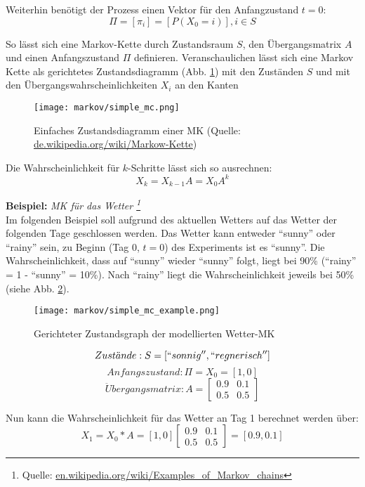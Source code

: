 Weiterhin benötigt der Prozess einen Vektor für den Anfangzustand \( t = 0 \):
\[ \Pi = [ \pi_i] = [ P (X_0 = i) ] , i \in S \]

So lässt sich eine Markov-Kette durch Zustandsraum \(S\), den Übergangsmatrix \( A \) und einen Anfangszustand \( \Pi \) definieren.
Veranschaulichen lässt sich eine Markov Kette als gerichtetes Zustandsdiagramm (Abb. \ref{fig:simple_mc}) mit den Zuständen \(S\) und 
mit den Übergangswahrscheinlichkeiten \(X_i\) an den Kanten
\begin{figure}[htbp] \centering
    \texttt{[image: markov/simple\_mc.png]}
    \caption{Einfaches Zustandsdiagramm einer \acl{MK} (Quelle: \url{de.wikipedia.org/wiki/Markow-Kette})}
    \label{fig:simple_mc}
\end{figure}

Die Wahrscheinlichkeit für \( k \)-Schritte lässt sich so ausrechnen: 
\[ X_k = X_{k-1} A = X_0 A^k \] 


\textbf{Beispiel:} 
\textit{ \acl{MK} für das Wetter \footnote{Quelle: \url{en.wikipedia.org/wiki/Examples_of_Markov_chains}}} \\
Im folgenden Beispiel soll aufgrund des aktuellen Wetters auf das Wetter der folgenden Tage geschlossen werden.
Das Wetter kann entweder ``sunny'' oder ``rainy'' sein, zu Beginn (Tag 0, \( t = 0 \)) des Experiments ist es ``sunny''.
Die Wahrscheinlichkeit, dass auf ``sunny'' wieder ``sunny'' folgt, liegt bei 90\% (``rainy'' = 1 - ``sunny'' = 10\%). 
Nach ``rainy'' liegt die Wahrscheinlichkeit jeweils bei 50\% (siehe Abb. \ref{fig:simple_mc_example}).  
\begin{figure}[htbp] \centering
    \texttt{[image: markov/simple\_mc\_example.png]}
    \caption{ Gerichteter Zustandsgraph der modellierten Wetter-\acl{MK} }
    \label{fig:simple_mc_example}
\end{figure}


\[ Zust\ddot{a}nde: S = [``sonnig'', ``regnerisch''] \]
\[ Anfangszustand:  \Pi = X_0 = [1 , 0] \]
\[\ddot{U}bergangsmatrix: A = \begin {bmatrix} 0.9&0.1\\0.5&0.5 \end {bmatrix}
\]

Nun kann die Wahrscheinlichkeit für das Wetter an Tag 1 berechnet werden über: \\
\[ X_1 = X_0 * A = [ 1, 0 ] \begin {bmatrix} 0.9&0.1\\0.5&0.5 \end {bmatrix} = [ 0.9, 0.1] \]

